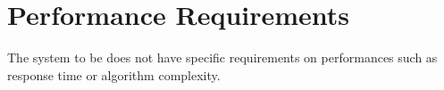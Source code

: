 \documentclass[../../rasd.tex]{subfiles}
\begin{document}
\section{Performance Requirements}
The system to be does not have specific requirements on performances such as response time or algorithm complexity.
\end{document}
